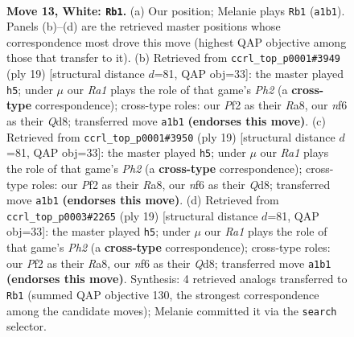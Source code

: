 \documentclass[11pt]{article}
\begin{document}
\clearpage

\begin{figure}[p]\centering
\begin{subfigure}{0.46\textwidth}\centering
\resizebox{\linewidth}{!}{%
\newchessgame
\chessboard[
  setfen={rnb3k1/pp1qr1pp/2p1pn2/5p2/1bPP4/2N1PNP1/P2B1PBP/R2QR1K1 w - - 3 13},
  showmover=false,
  pgfstyle=straightmove, color=movearrow, markmove={a1-b1}
]}
\caption{}
\end{subfigure}\hfill
\begin{subfigure}{0.46\textwidth}\centering
\resizebox{\linewidth}{!}{%
\newchessgame
\chessboard[
  setfen={r2q1rk1/pp1bppbp/2np1np1/8/3NP2P/1BN1BP2/PPP3P1/R2QK2R b KQ - 0 10},
  showmover=false,
  pgfstyle=straightmove, color=movearrow, markmove={h7-h5}
]}
\caption{}
\end{subfigure}
\\[4pt]
\begin{subfigure}{0.46\textwidth}\centering
\resizebox{\linewidth}{!}{%
\newchessgame
\chessboard[
  setfen={r2q1rk1/pp1bppbp/2np1np1/8/3NP2P/1BN1BP2/PPP3P1/R2QK2R b KQ - 0 10},
  showmover=false,
  pgfstyle=straightmove, color=movearrow, markmove={h7-h5}
]}
\caption{}
\end{subfigure}\hfill
\begin{subfigure}{0.46\textwidth}\centering
\resizebox{\linewidth}{!}{%
\newchessgame
\chessboard[
  setfen={r2q1rk1/pp1bppbp/2np1np1/8/3NP2P/1BN1BP2/PPP3P1/R2QK2R b KQ - 0 10},
  showmover=false,
  pgfstyle=straightmove, color=movearrow, markmove={h7-h5}
]}
\caption{}
\end{subfigure}
\caption{\textbf{Move 13, White: \texttt{Rb1}.} (a) Our position; Melanie plays \texttt{Rb1} (\texttt{a1b1}). Panels (b)--(d) are the retrieved master positions whose correspondence most drove this move (highest QAP objective among those that transfer to it). (b) Retrieved from \texttt{ccrl\_top\_p0001\#3949} (ply 19) [structural distance $d$=81, QAP obj=33]: the master played \texttt{h5}; under $\mu$ our \emph{Ra1} plays the role of that game's \emph{Ph2} (a \textbf{cross-type} correspondence); cross-type roles: our \emph{P}f2 as their \emph{R}a8, our \emph{n}f6 as their \emph{Q}d8; transferred move \texttt{a1b1} \textbf{(endorses this move)}. (c) Retrieved from \texttt{ccrl\_top\_p0001\#3950} (ply 19) [structural distance $d$=81, QAP obj=33]: the master played \texttt{h5}; under $\mu$ our \emph{Ra1} plays the role of that game's \emph{Ph2} (a \textbf{cross-type} correspondence); cross-type roles: our \emph{P}f2 as their \emph{R}a8, our \emph{n}f6 as their \emph{Q}d8; transferred move \texttt{a1b1} \textbf{(endorses this move)}. (d) Retrieved from \texttt{ccrl\_top\_p0003\#2265} (ply 19) [structural distance $d$=81, QAP obj=33]: the master played \texttt{h5}; under $\mu$ our \emph{Ra1} plays the role of that game's \emph{Ph2} (a \textbf{cross-type} correspondence); cross-type roles: our \emph{P}f2 as their \emph{R}a8, our \emph{n}f6 as their \emph{Q}d8; transferred move \texttt{a1b1} \textbf{(endorses this move)}. Synthesis: 4 retrieved analogs transferred to \texttt{Rb1} (summed QAP objective 130, the strongest correspondence among the candidate moves); Melanie committed it via the \texttt{search} selector.}
\label{fig:thought-m24}
\end{figure}
\end{document}

